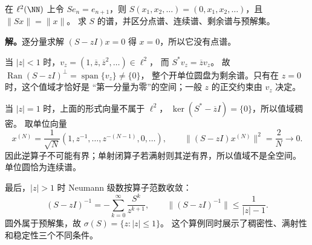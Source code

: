 \begin{workedexample}[单边移位的连续谱与剩余谱]
在 $\ell^2(\NN)$ 上令 $Se_n=e_{n+1}$，则
$S(x_1,x_2,\dots)=(0,x_1,x_2,\dots)$，且 $\|Sx\|=\|x\|$。
求 $S$ 的谱，并区分点谱、连续谱、剩余谱与预解集。

\textbf{解。}逐分量求解 $(S-zI)x=0$ 得 $x=0$，所以它没有点谱。

当 $|z|<1$ 时，$v_z=(1,\overline z,\overline z^2,\dots)\in\ell^2$，
而 $S^*v_z=\overline z v_z$。
故 $\operatorname{Ran}(S-zI)^\perp=\operatorname{span}\{v_z\}\ne\{0\}$，
整个开单位圆盘为剩余谱。只有在 $z=0$ 时，这个值域才恰好是
“第一分量为零”的空间；一般 $z$ 的正交约束由 $v_z$ 决定。

当 $|z|=1$ 时，上面的形式向量不属于 $\ell^2$，
$\ker(S^*-\overline zI)=\{0\}$，所以值域稠密。
取单位向量
\[
x^{(N)}=\frac1{\sqrt N}(1,z^{-1},\dots,z^{-(N-1)},0,\dots),
\qquad \|(S-zI)x^{(N)}\|^2=\frac2N\longrightarrow0.
\]
因此逆算子不可能有界；单射闭算子若满射则其逆有界，所以值域不是全空间。
单位圆恰为连续谱。

最后，$|z|>1$ 时 Neumann 级数按算子范数收敛：
\[
(S-zI)^{-1}=-\sum_{k=0}^\infty\frac{S^k}{z^{k+1}},
\qquad \|(S-zI)^{-1}\|\le\frac1{|z|-1}.
\]
圆外属于预解集，故 $\sigma(S)=\{z:|z|\le1\}$。
这个算例同时展示了稠密性、满射性和稳定性三个不同条件。
\end{workedexample}

